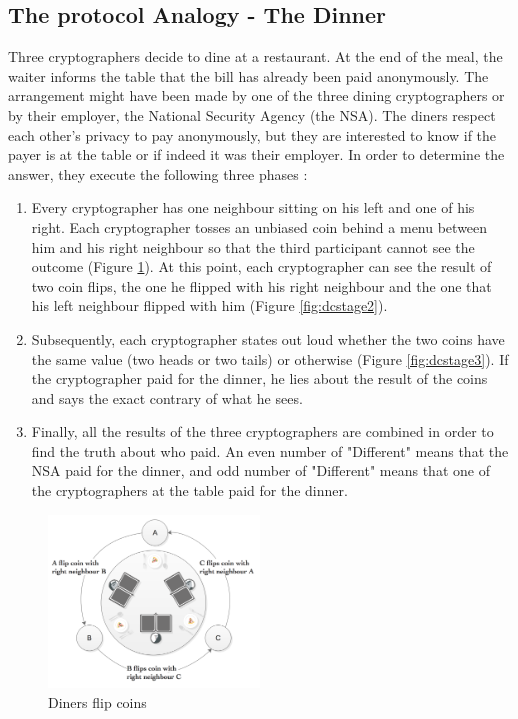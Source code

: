 \subsection{The protocol Analogy - The Dinner}
Three cryptographers decide to dine at a restaurant. At the end of the meal, the waiter informs the table that the bill has already been paid anonymously. The arrangement might have been made by one of the three dining cryptographers or by their employer, the National Security Agency (the NSA). The diners respect each other's privacy to pay anonymously, but they are interested to know if the payer is at the table or if indeed it was their employer. In order to determine the answer, they execute the following three phases \cite{Chaum}:
\begin{enumerate} \label{sec:protocolStages}
    \item Every cryptographer has one neighbour sitting on his left and one of his right. Each cryptographer tosses an unbiased coin behind a menu between him and his right neighbour so that the third participant cannot see the outcome (Figure \ref{fig:dcstage1}). At this point, each cryptographer can see the result of two coin flips, the one he flipped with his right neighbour and the one that his left neighbour flipped with him (Figure \ref{fig:dcstage2}). 
    \item Subsequently, each cryptographer states out loud whether the two coins have the same value (two heads or two tails) or otherwise (Figure \ref{fig:dcstage3}). If the cryptographer paid for the dinner, he lies about the result of the coins and says the exact contrary of what he sees.
    \item Finally, all the results of the three cryptographers are combined in order to find the truth about who paid. An even number of "Different" means that the NSA paid for the dinner, and odd number of "Different" means that one of the cryptographers at the table paid for the dinner.
\end{enumerate}

\begin{figure}[h!]
    \centering
    \includegraphics[width=0.50\textwidth]{Images/DCstep1.png}
    \caption{Diners flip coins}
    \label{fig:dcstage1}
\end{figure}

